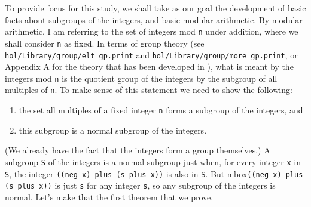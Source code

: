 To provide focus for this study, we shall take as our goal the
development of basic facts about subgroups of the integers, and  basic
modular arithmetic.  By modular arithmetic, I am referring to the set
of integers mod {\small\tt n} under addition, where we shall consider
{\small\tt n} as fixed.  In terms of group theory (see
{\small\verb+hol/Library/group/elt_gp.print+} and
{\small\verb+hol/Library/group/more_gp.print+}, or Appendix A for
the theory that has been developed in \HOL), what is meant by the
integers mod {\small\tt n} is the quotient group of the integers by
the subgroup of all multiples of {\small\tt n}.  To make sense of this
statement we need to show the following:
\begin{enumerate}
\item the set all multiples of a fixed integer {\small\tt n} forms a
   subgroup of the integers, and
\item this subgroup is a normal subgroup of the integers.
\end{enumerate}
(We already have the fact that the integers form a group themselves.)
A subgroup {\small\tt S} of the integers is a normal subgroup just
when, for every integer {\small\tt x} in {\small\tt S}, the integer
{\small\verb+((neg x) plus (s plus x))+} is also in {\small\tt S}.
But mbox{\small\verb+((neg x) plus (s plus x))+} is just {\small\tt s}
for any integer {\small\tt s}, so any subgroup of the integers is
normal.  Let's make that the first theorem that we prove.

